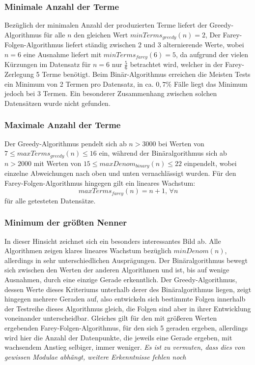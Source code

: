 \subsubsection{Minimale Anzahl der Terme}
Bezüglich der minimalen Anzahl der produzierten Terme liefert der Greedy-Algorithmus für alle $n$ den gleichen Wert $minTerms_{greedy}(n) = 2$, Der Farey-Folgen-Algorithmus liefert ständig zwischen $2$ und $3$ alternierende Werte, wobei $n=6$ eine Ausnahme liefert mit $minTerms_{farey}(6) = 5$, da aufgrund der vielen Kürzungen im Datensatz für $n=6$ nur $\frac{5}{6}$ betrachtet wird, welcher in der Farey-Zerlegung 5 Terme benötigt. Beim Binär-Algorithmus erreichen die Meisten Tests ein Minimum von 2 Termen pro Datensatz, in ca. $0,7\%$ Fälle liegt das Minimum jedoch bei 3 Termen. Ein besonderer Zusammenhang zwischen solchen Datensätzen wurde nicht gefunden.

\subsubsection{Maximale Anzahl der Terme}
 Der Greedy-Algorithmus pendelt sich ab $n>3000$ bei Werten von $7 \leq maxTerms_{greedy}(n) \leq 16$ ein, während der Binäralgorithmus sich ab $n>2000$ mit Werten von $15 \leq maxDenom_{binary}(n) \leq 22$ einpendelt, wobei einzelne Abweichungen nach oben und unten vernachlässigt wurden. Für den Farey-Folgen-Algorithmus hingegen gilt ein lineares Wachstum:
$$maxTerms_{farey}(n) = n + 1, \, \forall n$$
für alle getesteten Datensätze. 

\subsubsection{Minimum der größten Nenner}
In dieser Hinsicht zeichnet sich ein besonders interessantes Bild ab. Alle Algorithmen zeigen klares lineares Wachstum bezüglich $minDenom(n)$, allerdings in sehr unterschiedlichen Ausprägungen. Der Binäralgorithmus bewegt sich zwischen den Werten der anderen Algorithmen und ist, bis auf wenige Ausnahmen, durch eine einzige Gerade erkenntlich. Der Greedy-Algorithmus, dessen Werte dieses Kriteriums unterhalb derer des Binäralgorithmus liegen, zeigt hingegen mehrere Geraden auf, also entwickeln sich bestimmte Folgen innerhalb der Testreihe dieses Algorithmus gleich, die Folgen sind aber in ihrer Entwicklung voneinander unterscheidbar. Gleiches gilt für den mit größeren Werten ergebenden Farey-Folgen-Algorithmus, für den sich 5 geraden ergeben, allerdings wird hier die Anzahl der Datenpunkte, die jeweils eine Gerade ergeben, mit wachsendem Anstieg selbiger, immer weniger. \emph{Es ist zu vermuten, dass dies von gewissen Modulae abhängt, weitere Erkenntnisse fehlen noch}
